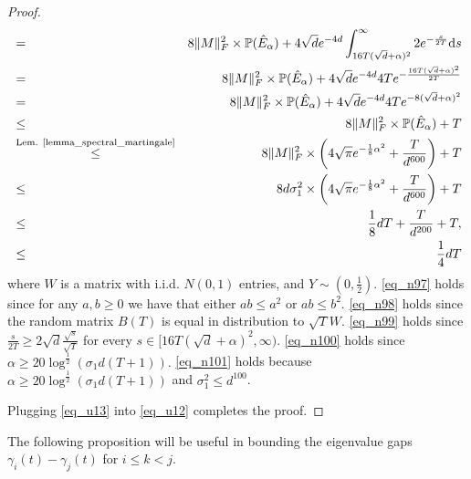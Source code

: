 \documentclass[11pt,letterpaper]{article}
\begin{document}
\begin{proof}
\begin{eqnarray}
                              &= & 8\|M\|_F^2\times \mathbb{P}(\hat{E}_\alpha)+ 4\sqrt{d} e^{-4d} \int_{16T(\sqrt{d} + \alpha)^2}^\infty 2e^{-\frac{s}{2T}}\mathrm{d}s\nonumber\\
                                 &= & 8\|M\|_F^2\times \mathbb{P}(\hat{E}_\alpha)+ 4\sqrt{d} e^{-4d} 4T e^{-\frac{16T(\sqrt{d} + \alpha)^2}{2T}}\nonumber\\
                               &= & 8\|M\|_F^2\times \mathbb{P}(\hat{E}_\alpha)+ 4\sqrt{d} e^{-4d} 4T e^{-8(\sqrt{d} + \alpha)^2}\nonumber\\
                               &\leq & 8\|M\|_F^2\times \mathbb{P}(\hat{E}_\alpha)+ T \label{eq_n100}\\ 
                               &\stackrel{\textrm{Lem. \ref{lemma_spectral_martingale}}}{\leq} &  8\|M\|_F^2\times \left(4\sqrt{\pi} e^{-\frac{1}{8}\alpha^2}+ \frac{T}{d^{600}}\right)+ T\nonumber\\
                            &\leq & 8 d \sigma_1^2 \times \left(4\sqrt{\pi} e^{-\frac{1}{8}\alpha^2}+ \frac{T}{d^{600}}\right) +T \nonumber\\
                            &\leq & \frac{1}{8}d T + \frac{T}{d^{200}} +T, \label{eq_n101}\\
                            &\leq & \frac{1}{4}d T \label{eq_u13}
\end{eqnarray}
%
where $W$ is a matrix with i.i.d. $N(0,1)$ entries, and $Y\sim(0,\frac{1}{2})$.
%
{\eqref{eq_n97} holds since for any $a,b \geq 0$ we have that either $ab \leq a^2$ or $ab \leq b^2$.
%
\eqref{eq_n98} holds since the random matrix $B(T)$ is equal in distribution to $\sqrt{T}W$. \eqref{eq_n99} holds since $\frac{s}{2T} \geq 2 \sqrt{d} \frac{\sqrt{s}}{\sqrt{T}}$ for every $s \in [16T(\sqrt{d} + \alpha)^2, \infty)$. \eqref{eq_n100} holds since $\alpha \geq 20\log^{\frac{1}{2}}(\sigma_1 d (T+1))$. }
%
 \eqref{eq_n101} holds because $\alpha \geq 20\log^{\frac{1}{2}}(\sigma_1 d (T+1))$ and $\sigma_1^2 \leq d^{100}$.

Plugging \eqref{eq_u13} into \eqref{eq_u12} completes the proof.
\end{proof}
%
\noindent
The following proposition will be useful in bounding the eigenvalue gaps $\gamma_i(t) - \gamma_j(t)$ for $i\leq k < j$.
\end{document}
